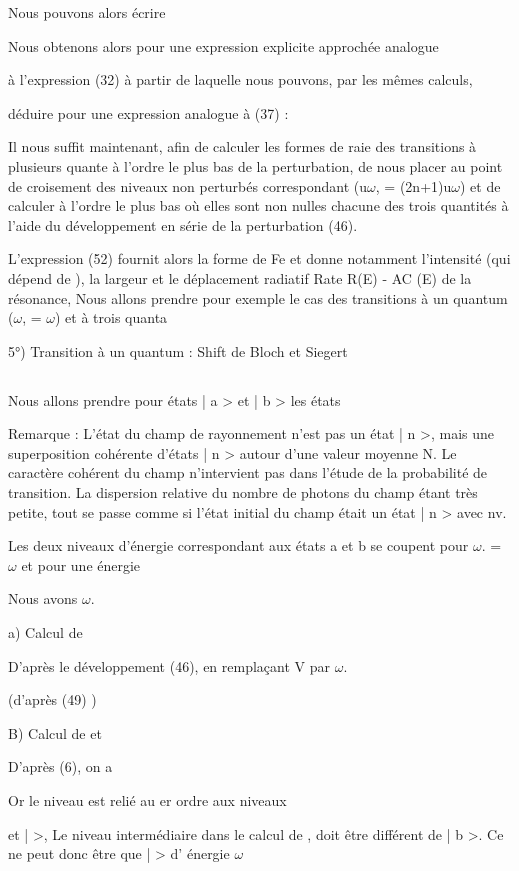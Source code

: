 Nous pouvons alors écrire

Nous obtenons alors pour  une expression explicite approchée analogue

à l'expression (32) à partir de laquelle nous pouvons, par les mêmes calculs,

déduire pour  une expression analogue à (37) :

Il nous suffit maintenant, afin de calculer les formes de raie des transitions
à plusieurs quante à l'ordre le plus bas de la perturbation, de nous placer au
point de croisement des niveaux non perturbés correspondant (u$\omega$, = (2n+1)u$\omega$) et
de calculer à l'ordre le plus bas où elles sont non nulles chacune des trois
quantités  à l'aide du développement en série de la perturbation (46).

L'expression (52) fournit alors la forme de Fe et donne notamment l'intensité (qui dépend de ),
la largeur  et le déplacement radiatif Rate R(E) - AC (E) de la résonance, Nous allons prendre pour
exemple le cas des transitions à un quantum ($\omega$, = $\omega$) et à trois quanta

5°) Transition à un quantum : Shift de Bloch et Siegert
\subsection{}%
Nous allons prendre pour états | a > et | b > les états

Remarque : L'état du champ de rayonnement n'est pas un état | n >, mais une superposition
cohérente d'états | n > autour d'une valeur moyenne N. Le caractère
cohérent du champ n'intervient pas dans l'étude de la probabilité de transition.
La dispersion relative du nombre de photons du champ  étant très
petite, tout se passe comme si l'état initial du champ était un état | n >
avec nv.

Les deux niveaux d'énergie correspondant aux états a et b se coupent
pour $\omega$. = $\omega$ et pour une énergie 

Nous avons $\omega$.

a) Calcul de 

D'après le développement (46), en remplaçant V par
$\omega$.

(d'après (49) )


B) Calcul de  et 

D'après (6), on a

Or le niveau  est relié au er ordre aux niveaux

et |  >, Le niveau intermédiaire dans le calcul de ,  doit être différent de | b >.
Ce ne peut donc être que |  > d' énergie $\omega$

